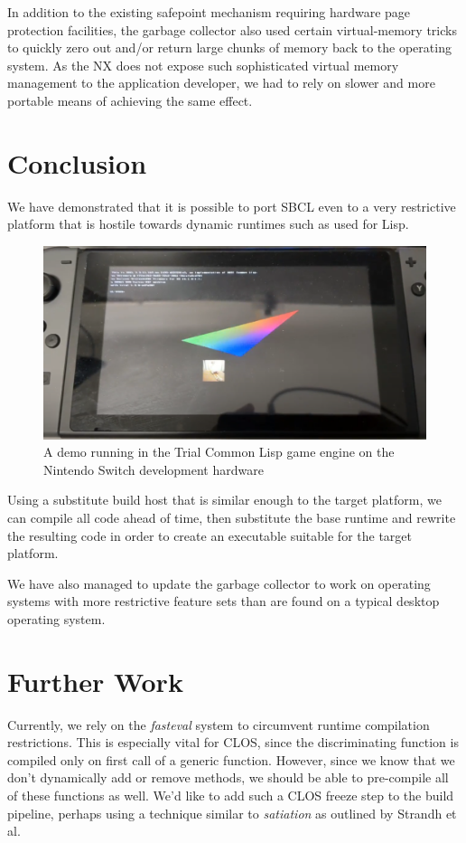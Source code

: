 \documentclass[format=sigconf]{acmart}
\begin{document}
In addition to the existing safepoint mechanism requiring hardware page protection facilities, the garbage collector also used certain virtual-memory tricks to quickly zero out and/or return large chunks of memory back to the operating system. As the NX does not expose such sophisticated virtual memory management to the application developer, we had to rely on slower and more portable means of achieving the same effect.

\section{Conclusion}\label{conclusion}
We have demonstrated that it is possible to port SBCL even to a very restrictive platform that is hostile towards dynamic runtimes such as used for Lisp.

\begin{figure}[h]
  \centering
  \includegraphics[width=\linewidth]{photo.png}
  \caption{A demo running in the Trial Common Lisp game engine on the Nintendo Switch development hardware}
\end{figure}

Using a substitute build host that is similar enough to the target platform, we can compile all code ahead of time, then substitute the base runtime and rewrite the resulting code in order to create an executable suitable for the target platform.

We have also managed to update the garbage collector to work on operating systems with more restrictive feature sets than are found on a typical desktop operating system.

\section{Further Work}\label{further-work}
Currently, we rely on the \textit{fasteval} system to circumvent runtime compilation restrictions. This is especially vital for CLOS, since the discriminating function is compiled only on first call of a generic function. However, since we know that we don't dynamically add or remove methods, we should be able to pre-compile all of these functions as well. We'd like to add such a CLOS freeze step to the build pipeline, perhaps using a technique similar to \textit{satiation} as outlined by Strandh et al.\cite{strandh2014resolving}
\end{document}
